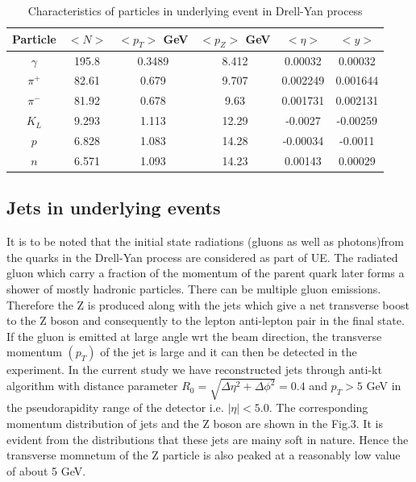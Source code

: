 \documentclass[12pt,a4paper]{article}		%
\begin{document}
\begin{table}
\caption{Characteristics of particles in underlying event in Drell-Yan process}
\begin{center}
	\begin{tabular}{|c|c|c|c|c|c|}
		\hline
		Particle & $<N>$ & $<p_T>$ GeV & $<p_Z>$ GeV & $<\eta>$& $<y>$ \\
		\hline
	   $\gamma$ & 195.8 & 0.3489& 8.412& 0.00032& 0.00032\\
				\hline
		$\pi^+$ & 82.61 & 0.679& 9.707& 0.002249 &0.001644\\
		\hline
		$\pi^-$ & 81.92 & 0.678& 9.63& 0.001731 &0.002131\\
	    \hline
		$K_L$ & 9.293 & 1.113& 12.29& -0.0027  &-0.00259\\
		\hline

				
	   $p$ & 6.828 & 1.083& 14.28& -0.00034& -0.0011\\
	   \hline
	   $n$ & 6.571 & 1.093& 14.23& 0.00143& 0.00029\\
	   \hline							
	\end{tabular}
\end{center}
\label{tab:ue}
\end{table}

\subsection{Jets in underlying events }

It is to be noted that the initial state radiations (gluons as well as photons)from the quarks in the Drell-Yan process are considered as part of UE. The radiated gluon  which carry a fraction of the momentum of the parent quark later forms a shower of mostly hadronic particles. There can be multiple gluon emissions. Therefore the Z is produced along with the jets which give a net transverse boost to the Z boson and consequently to the lepton anti-lepton pair in the final state. If the gluon is emitted at large angle wrt the beam direction, the transverse momentum $(p_T)$ of the jet is large and it can then be detected in the experiment. In the current study we have reconstructed jets through anti-kt algorithm with distance parameter $ R_0 = \sqrt{\Delta \eta^2 + \Delta \phi^2} = 0.4$ and  $p_T > 5$ GeV in the pseudorapidity range of the detector i.e. $|\eta|<5.0$.  The corresponding momentum distribution of jets and the Z boson are shown in the Fig.3. It is evident from the distributions that these jets are mainy soft in nature. Hence the transverse momnetum of the Z particle is also peaked at a reasonably low value of about 5 GeV.
\end{document}
